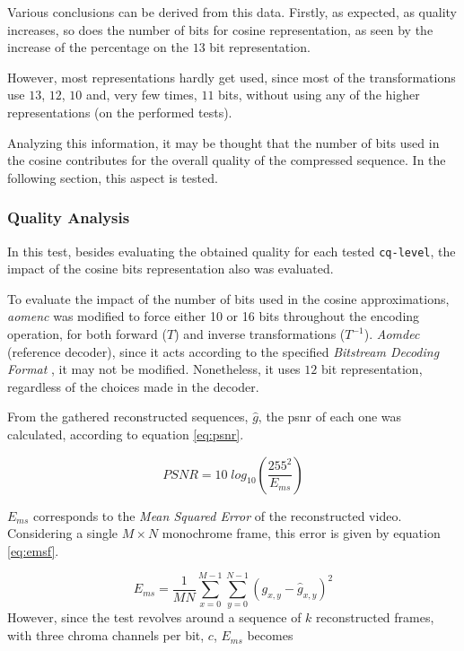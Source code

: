 Various conclusions can be derived from this data.
Firstly, as expected, as quality increases, so does the number of bits for cosine representation, as seen by the increase of the percentage on the $13$ bit representation.

However, most representations hardly get used, since most of the transformations use $13$, $12$, $10$ and, very few times, $11$ bits, without using any of the higher representations (on the performed tests). 

Analyzing this information, it may be thought that the number of bits used in the cosine contributes for the overall quality of the compressed sequence. In the following section, this aspect is tested.

\subsubsection{Quality Analysis}

In this test, besides evaluating the obtained quality for each tested \texttt{cq-level}, the impact of the cosine bits representation also was evaluated. 

To evaluate the impact of the number of bits used in the cosine approximations, \emph{aomenc} was modified to force either 10 or 16 bits throughout the encoding operation, for both forward ($T$) and inverse transformations ($T^{-1}$). \emph{Aomdec} (reference decoder), since it acts according to the specified \emph{Bitstream Decoding Format} \cite{AV1BitstreamDecoding}, it may not be modified. Nonetheless, it uses $12$ bit representation, regardless of the choices made in the decoder.

From the gathered reconstructed sequences, $\hat{g}$, the \gls{psnr} of each one was calculated, according to equation \ref{eq:psnr}.

\begin{equation} \label{eq:psnr}
    PSNR = 10\;log_{10}\left(\frac{255^2}{E_{ms}}\right)
\end{equation}

$E_{ms}$ corresponds to the \emph{Mean Squared Error} of the reconstructed video. Considering a single $M \times N$ monochrome frame, this error is given by equation \ref{eq:emsf}.

\begin{equation} \label{eq:emsf}
    E_{ms} = \frac{1}{MN}\sum^{M-1}_{x=0} \sum^{N-1}_{y=0} \left(g_{x,y} - \hat{g}_{x,y}\right)^2
\end{equation}
However, since the test revolves around a sequence of $k$ reconstructed frames, with three chroma channels per bit, $c$, $E_{ms}$ becomes


